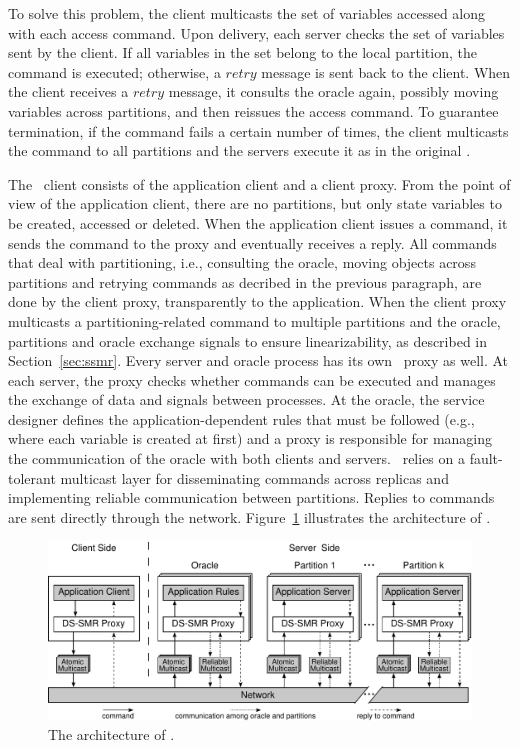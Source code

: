 To solve this problem, the client multicasts the set of variables accessed along with each access command.
Upon delivery, each server checks the set of variables sent by the client.
If all variables in the set belong to the local partition, the command is executed; otherwise, a $retry$ message is sent back to the client.
When the client receives a $retry$ message, it consults the oracle again, possibly moving variables across partitions, and then reissues the access command.
To guarantee termination, if the command fails a certain number of times, the client multicasts the command to all partitions and the servers execute it as in the original \ssmr{}.



The \dssmr\ client consists of the application client and a client proxy.
From the point of view of the application client, there are no partitions, but only state variables to be created, accessed or deleted.
When the application client issues a command, it sends the command to the proxy and eventually receives a reply.
All commands that deal with partitioning, i.e., consulting the oracle, moving objects across partitions and retrying commands as decribed in the previous paragraph, are done by the client proxy, transparently to the application.
When the client proxy multicasts a partitioning-related command to multiple partitions and the oracle, partitions and oracle exchange signals to ensure linearizability, as described in Section~\ref{sec:ssmr}.
Every server and oracle process has its own \dssmr\ proxy as well.
At each server, the proxy checks whether commands can be executed and manages the exchange of data and signals between processes.
At the oracle, the service designer defines the application-dependent rules that must be followed (e.g., where each variable is created at first) and a proxy is responsible for managing the communication of the oracle with both clients and servers.
\dssmr\ relies on a fault-tolerant multicast layer for disseminating commands across replicas and implementing reliable communication between partitions.
Replies to commands are sent directly through the network.
Figure~\ref{fig:arch} illustrates the architecture of \dssmr{}.

\begin{figure}
\begin{minipage}[b]{1.0\linewidth} %
\centering
      \includegraphics[width=0.65\linewidth]{figures/arch}
\end{minipage}
\caption{The architecture of \dssmrlong{}.}
\label{fig:arch}
\end{figure}


